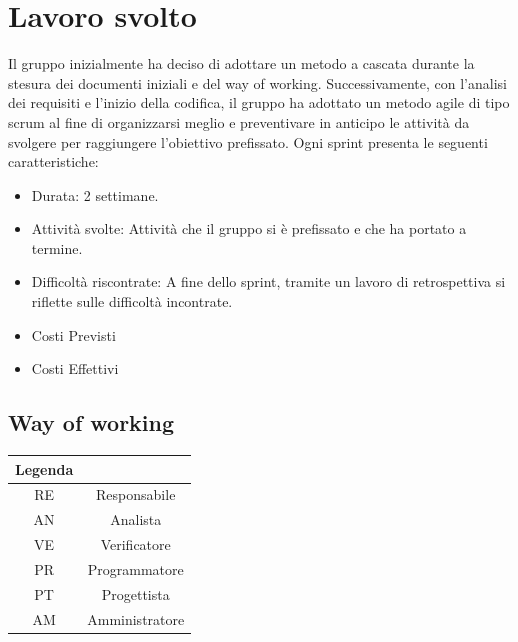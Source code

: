 \section{Lavoro svolto}
Il gruppo inizialmente ha deciso di adottare un metodo a cascata durante la stesura dei documenti iniziali e del way of working. 
Successivamente, con l'analisi dei requisiti e l'inizio della codifica, il gruppo ha adottato un metodo agile di tipo scrum al fine di organizzarsi meglio e preventivare in anticipo le attività da svolgere per raggiungere l'obiettivo prefissato.
Ogni sprint presenta le seguenti caratteristiche:
\begin{itemize}
    \item{Durata:} 2 settimane.
    \item{Attività svolte:} Attività che il gruppo si è prefissato e che ha portato a termine.
    \item{Difficoltà riscontrate:} A fine dello sprint, tramite un lavoro di retrospettiva si riflette sulle difficoltà incontrate.
    \item{Costi Previsti}
    \item{Costi Effettivi}
\end{itemize}

\subsection{Way of working}




\begin{longtable}{|c|c|}
    \hline
    \textbf{Legenda} & \\
    \hline
    RE & Responsabile \\
    \hline
    AN & Analista \\
    \hline
    VE & Verificatore \\
    \hline
    PR & Programmatore \\
    \hline
    PT & Progettista \\
    \hline
    AM & Amministratore \\
    \hline
\end{longtable}

